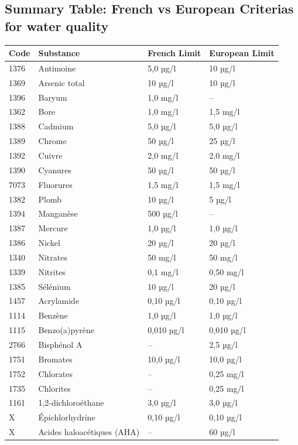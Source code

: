 \documentclass{article}
\begin{document}
\subsection{Summary Table: French vs European Criterias for water quality}
\begin{table}[H]
\centering
\begin{tabular}{|l|l|l|l|}
\hline
\textbf{Code} & \textbf{Substance} & \textbf{French Limit} & \textbf{European Limit} \\
\hline
1376 & Antimoine & 5,0 µg/l & 10 µg/l \\
1369 & Arsenic total & 10 µg/l & 10 µg/l \\
1396 & Baryum & 1,0 mg/l & -- \\
1362 & Bore & 1,0 mg/l & 1,5 mg/l \\
1388 & Cadmium & 5,0 µg/l & 5,0 µg/l \\
1389 & Chrome & 50 µg/l & 25 µg/l \\
1392 & Cuivre & 2,0 mg/l & 2,0 mg/l \\
1390 & Cyanures & 50 µg/l & 50 µg/l \\
7073 & Fluorures & 1,5 mg/l & 1,5 mg/l \\
1382 & Plomb & 10 µg/l & 5 µg/l \\
1394 & Manganèse & 500 µg/l & -- \\
1387 & Mercure & 1,0 µg/l & 1,0 µg/l \\
1386 & Nickel & 20 µg/l & 20 µg/l \\
1340 & Nitrates & 50 mg/l & 50 mg/l \\
1339 & Nitrites & 0,1 mg/l & 0,50 mg/l \\
1385 & Sélénium & 10 µg/l & 20 µg/l \\
1457 & Acrylamide & 0,10 µg/l & 0,10 µg/l \\
1114 & Benzène & 1,0 µg/l & 1,0 µg/l \\
1115 & Benzo(a)pyrène & 0,010 µg/l & 0,010 µg/l \\
2766 & Bisphénol A & -- & 2,5 µg/l \\
1751 & Bromates & 10,0 µg/l & 10,0 µg/l \\
1752 & Chlorates & -- & 0,25 mg/l \\
1735 & Chlorites & -- & 0,25 mg/l \\
1161 & 1,2-dichloroéthane & 3,0 µg/l & 3,0 µg/l \\
X & Épichlorhydrine & 0,10 µg/l & 0,10 µg/l \\
X & Acides haloacétiques (AHA) & -- & 60 µg/l \\

\end{tabular}
\end{table}
\end{document}
